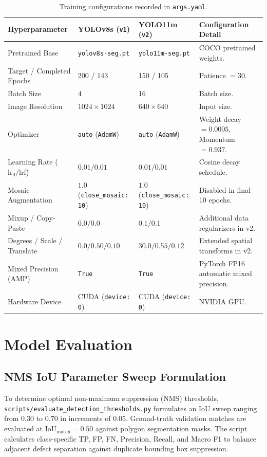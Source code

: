 \documentclass[11pt,a4paper]{article}
\begin{document}
\begin{table}[htbp]
\centering
\small
\caption{Training configurations recorded in \texttt{args.yaml}.}
\label{tab:training_hyperparams}
\begin{tabularx}{\textwidth}{l p{3.8cm} p{3.8cm} X}
\toprule
\textbf{Hyperparameter} & \textbf{YOLOv8s (\texttt{v1})} & \textbf{YOLO11m (\texttt{v2})} & \textbf{Configuration Detail} \\
\midrule
Pretrained Base & \texttt{yolov8s-seg.pt} & \texttt{yolo11m-seg.pt} & COCO pretrained weights. \\
Target / Completed Epochs & 200 / 143 & 150 / 105 & Patience $= 30$. \\
Batch Size & 4 & 16 & Batch size. \\
Image Resolution & $1024\times 1024$ & $640\times 640$ & Input size. \\
Optimizer & \texttt{auto} (\texttt{AdamW}) & \texttt{auto} (\texttt{AdamW}) & Weight decay $= 0.0005$, Momentum $= 0.937$. \\
Learning Rate ($\text{lr}_0 / \text{lrf}$) & $0.01 / 0.01$ & $0.01 / 0.01$ & Cosine decay schedule. \\
Mosaic Augmentation & $1.0$ (\texttt{close\_mosaic: 10}) & $1.0$ (\texttt{close\_mosaic: 10}) & Disabled in final 10 epochs. \\
Mixup / Copy-Paste & $0.0 / 0.0$ & $0.1 / 0.1$ & Additional data regularizers in v2. \\
Degrees / Scale / Translate & $0.0 / 0.50 / 0.10$ & $30.0 / 0.55 / 0.12$ & Extended spatial transforms in v2. \\
Mixed Precision (AMP) & \texttt{True} & \texttt{True} & PyTorch FP16 automatic mixed precision. \\
Hardware Device & CUDA (\texttt{device: 0}) & CUDA (\texttt{device: 0}) & NVIDIA GPU. \\
\bottomrule
\end{tabularx}
\end{table}

\section{Model Evaluation}

\subsection{NMS IoU Parameter Sweep Formulation}
To determine optimal non-maximum suppression (NMS) thresholds, \texttt{scripts/evaluate\_detection\_thresholds.py} formulates an IoU sweep ranging from $0.30$ to $0.70$ in increments of $0.05$. Ground-truth validation matches are evaluated at $\text{IoU}_{\text{match}} = 0.50$ against polygon segmentation masks. The script calculates class-specific TP, FP, FN, Precision, Recall, and Macro F1 to balance adjacent defect separation against duplicate bounding box suppression.
\end{document}
